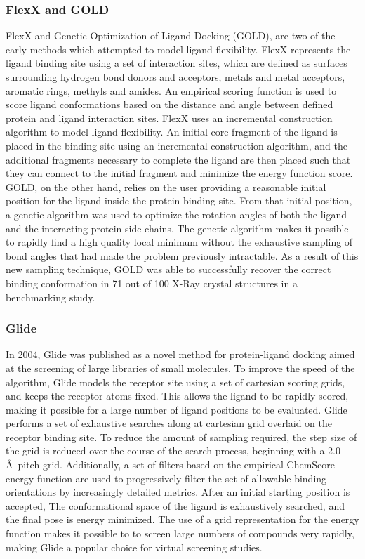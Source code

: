 \subsubsection{FlexX and GOLD}
FlexX\citep{Rarey:1996hf} and Genetic Optimization of Ligand Docking (GOLD)\citep{Jones:1997bl}, are two of the early methods which attempted to model ligand flexibility.
FlexX represents the ligand binding site using a set of interaction sites, which are defined as surfaces surrounding hydrogen bond donors and acceptors, metals and metal acceptors, aromatic rings, methyls and amides.
An empirical scoring function is used to score ligand conformations based on the distance and angle between defined protein and ligand interaction sites.
FlexX uses an incremental construction algorithm to model ligand flexibility.
An initial core fragment of the ligand is placed in the binding site using an incremental construction algorithm, and the additional fragments necessary to complete the ligand are then placed such that they can connect to the initial fragment and minimize the energy function score. 
GOLD, on the other hand, relies on the user providing a reasonable initial position for the ligand inside the protein binding site.
From that initial position, a genetic algorithm\citep{Jones:1995vw} was used to optimize the rotation angles of both the ligand and the interacting protein side-chains. 
The genetic algorithm makes it possible to rapidly find a high quality local minimum without the exhaustive sampling of bond angles that had made the problem previously intractable.
As a result of this new sampling technique, GOLD was able to successfully recover the correct binding conformation in 71 out of 100 X-Ray crystal structures in a benchmarking study. 

\subsubsection{Glide}
In 2004, Glide\citep{Friesner:2004hm} was published as a novel method for protein-ligand docking aimed at the screening of large libraries of small molecules.
To improve the speed of the algorithm, Glide models the receptor site using a set of cartesian scoring grids, and keeps the receptor atoms fixed.
This allows the ligand to be rapidly scored, making it possible for a large number of ligand positions to be evaluated.
Glide performs a set of exhaustive searches along at cartesian grid overlaid on the receptor binding site.
To reduce the amount of sampling required, the step size of the grid is reduced over the course of the search process, beginning with a 2.0 \AA\ pitch grid.
Additionally, a set of filters based on the empirical ChemScore\citep{Eldridge:1997tm} energy function are used to progressively filter the set of allowable binding orientations by increasingly detailed metrics.
After an initial starting position is accepted, The conformational space of the ligand is exhaustively searched, and the final pose is energy minimized.
The use of a grid representation for the energy function makes it possible to to screen large numbers of compounds very rapidly, making Glide a popular choice for virtual screening studies\citep{Yilmaz:2013dj,Bauer:2013de}.


